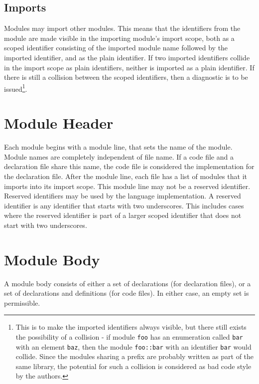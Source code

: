 \documentclass[letterpaper,12pt]{book}
\begin{document}
\subsection{Imports}

Modules may import other modules. This means that the identifiers from the module are made visible in the importing module's import scope, both as a scoped identifier consisting of the imported module name followed by the imported identifier, and as the plain identifier. If two imported identifiers collide in the import scope as plain identifiers, neither is imported as a plain identifier. If there is still a collision between the scoped identifiers, then a diagnostic is to be issued\footnote{This is to make the imported identifiers always visible, but there still exists the possibility of a collision - if module \texttt{foo} has an enumeration called \texttt{bar} with an element \texttt{baz}, then the module \texttt{foo::bar} with an identifier \texttt{bar} would collide. Since the modules sharing a prefix are probably written as part of the same library, the potential for such a collision is considered as bad code style by the authors.}.

\section{Module Header}

Each module begins with a module line, that sets the name of the module. Module names are completely independent of file name. If a code file and a declaration file share this name, the code file is considered the implementation for the declaration file. After the module line, each file has a list of modules that it imports into its import scope. This module line may not be a reserved identifier. Reserved identifiers may be used by the language implementation. A reserved identifier is any identifier that starts with two underscores. This includes cases where the reserved identifier is part of a larger scoped identifier that does not start with two underscores.

\section{Module Body}

A module body consists of either a set of declarations (for declaration files), or a set of declarations and definitions (for code files). In either case, an empty set is permissible.
\end{document}
